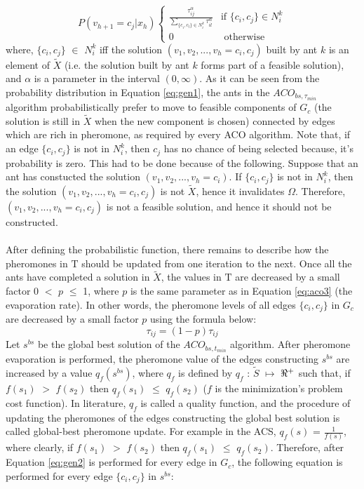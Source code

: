 \documentclass[12pt]{article}
\numberwithin{equation}{subsection}
\numberwithin{table}{subsection}
\numberwithin{algorithm}{subsection}
\numberwithin{figure}{subsection}
\begin{document}
\begin{equation}
  \label{eq:gen1}
  P(v_{h+1}=c_j | x_h)\begin{cases}
             \displaystyle {\frac{\tau_{ij}^\alpha}{\sum_{\{c_i,c_l\} \in N_i^k}  \tau_{il}^\alpha}} &\text{if } \{c_i,c_j\} \in N_i^k\\ 
             0 &\text{ 	otherwise}
            \end{cases}
\end{equation}
where, $\{c_i,c_j\}$ $\in$ $N_i^k$ iff the solution $(v_1, v_2, ..., v_h = c_i, c_j)$ built by ant $k$ is an element of $\widetilde{X}$ (i.e. the solution built by ant $k$ forms part of a feasible solution), and $\alpha$ is a parameter in the interval $(0,\infty)$. As it can be seen from the probability distribution in Equation \ref{eq:gen1}, the ants in the $ACO_{bs, \tau_{min}}$ algorithm probabilistically prefer to move to feasible components of $G_c$ (the solution is still in $\widetilde{X}$ when the new component is chosen) connected by edges which are rich in pheromone, as required by every ACO algorithm. Note that, if an edge $\{c_i, c_j\}$ is not in $N_i^k$, then $c_j$ has no chance of being selected because, it's probability is zero. This had to be done because of the following. Suppose that an ant has constucted the solution $(v_1, v_2, ..., v_h = c_i)$. If $\{c_i, c_j\}$ is not in $N_i^k$, then the solution $(v_1, v_2, ..., v_h = c_i, c_j)$ is not $\widetilde{X}$, hence it invalidates $\Omega$. Therefore, $(v_1, v_2, ..., v_h = c_i, c_j)$ is not a feasible solution, and hence it should not be constructed. \cite{dorigo_stutzle_thomas_2004}\\\\
After defining the probabilistic function, there remains to describe how the pheromones in $\mathrm{T}$ should be updated from one iteration to the next. Once all the ants have completed a solution in $\widetilde{X}$, the values in $\mathrm{T}$ are decreased by a small factor 0 $<$ $p$ $\leq$ 1, where $p$ is the same parameter as in Equation \ref{eq:aco3} (the evaporation rate). In other words, the pheromone levels of all edges $\{c_i, c_j\}$ in $G_c$ are decreased by a small factor $p$ using the formula below:
\begin{equation}
  \label{eq:gen2}
  \tau_{ij}= (1-p)\tau_{ij}
\end{equation}
Let $s^{bs}$ be the global best solution of the $ACO_{bs, t_{min}}$ algorithm. After pheromone evaporation is performed, the pheromone value of the edges constructing $s^{bs}$ are increased by a value $q_f(s^{bs})$, where $q_f$ is defined by $q_f$ : $\widetilde{S}$ $\mapsto$ $\real^+$ such that, if $f(s_1)$ $>$ $f(s_2)$ then $q_f(s_1)$ $\leq$ $q_f(s_2)$ ($f$ is the minimization's problem cost function). In literature, $q_f$ is called a quality function, and the procedure of updating the pheromones of the edges constructing the global best solution is called global-best pheromone update. For example in the ACS, $q_f(s)$ = $\frac{1}{f(s)}$, where clearly, if  $f(s_1)$ $>$ $f(s_2)$ then $q_f(s_1)$ $\leq$ $q_f(s_2)$. Therefore, after Equation \ref{eq:gen2} is performed for every edge in $G_c$, the following equation is performed for every edge $\{c_i, c_j\}$ in $s^{bs}$: 
\end{document}
